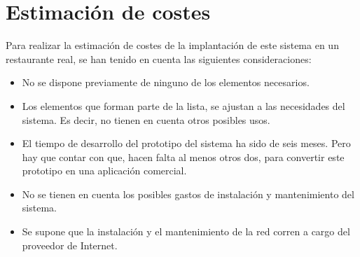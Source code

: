 \section{Estimación de costes}
Para realizar la estimación de costes de la implantación de este sistema en
un restaurante real, se han tenido en cuenta las siguientes consideraciones:
\begin{itemize}
\item No se dispone previamente de ninguno de los elementos necesarios.
\item Los elementos que forman parte de la lista, se ajustan a las necesidades
del sistema. Es decir, no tienen en cuenta otros posibles usos.
\item El tiempo de desarrollo del prototipo del sistema ha sido de seis meses.
Pero hay que contar con que, hacen falta al menos otros dos, para
convertir este prototipo en una aplicación comercial.
\item No se tienen en cuenta los posibles gastos de instalación y
mantenimiento del sistema.
\item Se supone que la instalación y el mantenimiento de la red corren a cargo
del proveedor de Internet.
\end{itemize}

